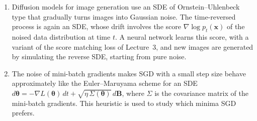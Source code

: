 \begin{remark}
    \begin{enumerate}
        \item Diffusion models for image generation use an SDE of Ornstein--Uhlenbeck type that gradually turns images into Gaussian noise. The time-reversed process is again an SDE, whose drift involves the score $\nabla\log p_t(\mathbf{x})$ of the noised data distribution at time $t$. A neural network learns this score, with a variant of the score matching loss of Lecture~3, and new images are generated by simulating the reverse SDE, starting from pure noise.
        \item The noise of mini-batch gradients makes SGD with a small step size behave approximately like the Euler--Maruyama scheme for an SDE $d\boldsymbol{\theta} = -\nabla L(\boldsymbol{\theta})\,dt + \sqrt{\eta\,\Sigma(\boldsymbol{\theta})}\,d\mathbf{B}$, where $\Sigma$ is the covariance matrix of the mini-batch gradients. This heuristic is used to study which minima SGD prefers.
    \end{enumerate}
\end{remark}

